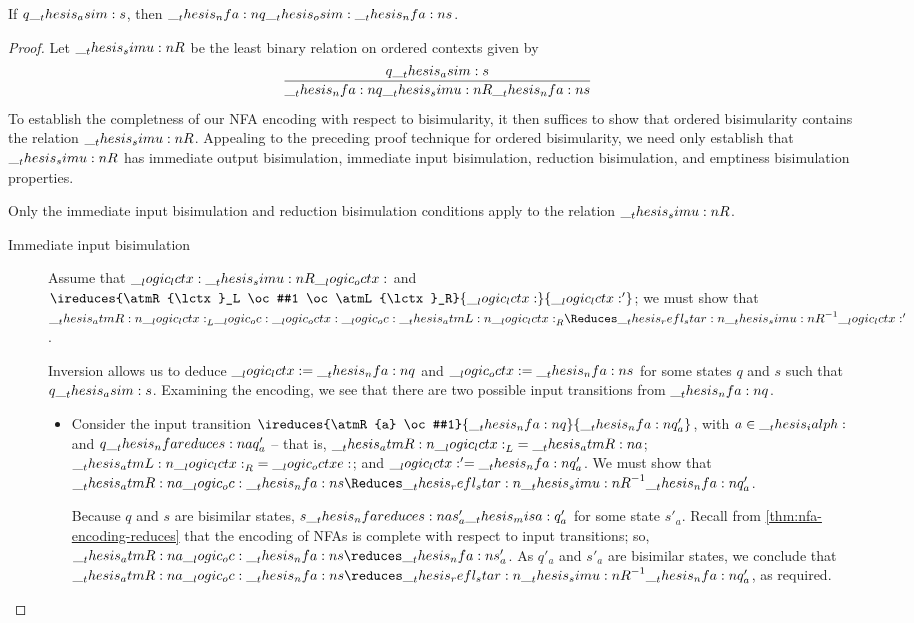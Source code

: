\begin{theorem}
  If $q \__thesis_asim: s$, then $\__thesis_nfa:n {q} \__thesis_osim: \__thesis_nfa:n {s}$.
\end{theorem}
%
\begin{proof}
  Let $\__thesis_simu:n {R}$ be the least binary relation%
  on ordered contexts given by
  \begin{equation*}
    \infer{\nfa{q} \simu{R} \nfa{s}}{
      q \asim s}
  \end{equation*}
  To establish the completness of our \ac{NFA} encoding with respect to bisimularity, it then suffices to show that ordered bisimularity contains the relation $\__thesis_simu:n {R}$.
  Appealing to the preceding proof technique for ordered bisimularity, we need only establish that $\__thesis_simu:n {R}$ has immediate output bisimulation, immediate input bisimulation, reduction bisimulation, and emptiness bisimulation properties.

  Only the immediate input bisimulation and reduction bisimulation conditions apply to the relation $\__thesis_simu:n {R}$.
  \begin{description}
  \item[Immediate input bisimulation]
    Assume that $\__logic_lctx: \__thesis_simu:n {R} \__logic_octx:$ and $\ireduces{\atmR{\lctx}_L \oc #1 \oc \atmL{\lctx}_R}{\lctx}{\lctx'}$;
    we must show that $\atmR{\lctx}_L \oc \octx \oc \atmL{\lctx}_R \Reduces\refl*{\simu{R}}^{-1} \lctx'$.

    Inversion allows us to deduce $\__logic_lctx: = \__thesis_nfa:n {q}$ and $\__logic_octx: = \__thesis_nfa:n {s}$ for some states $q$ and $s$ such that $q \__thesis_asim: s$.
    Examining the encoding, we see that there are two possible input transitions from $\__thesis_nfa:n {q}$.
    \begin{itemize}
    \item Consider the input transition $\ireduces{\atmR{a} \oc #1}{\nfa{q}}{\nfa{q}'_a}$, with $a \in \__thesis_ialph:$ and $q \nfareduces[a] q'_a$ -- that is, $\__thesis_atmR:n {\__logic_lctx:}_L = \__thesis_atmR:n {a}$; $\__thesis_atmL:n {\__logic_lctx:}_R = \__logic_octxe:$; and $\__logic_lctx:' = \__thesis_nfa:n {q}'_a$.
      We must show that $\atmR{a} \oc \nfa{s} \Reduces\refl*{\simu{R}}^{-1} \nfa{q}'_a$.

      Because $q$ and $s$ are bisimilar states, $s \nfareduces[a] s'_a \misa q'_a$ for some state $s'_a$.
      Recall from \cref{thm:nfa-encoding-reduces} that the encoding of \acp{NFA} is complete with respect to input transitions; so, $\atmR{a} \oc \nfa{s} \reduces \nfa{s}'_a$.
      As $q'_a$ and $s'_a$ are bisimilar states, we conclude that $\atmR{a} \oc \nfa{s} \reduces\refl*{\simu{R}}^{-1} \nfa{q}'_a$, as required.


\end{itemize}
\end{description}
\end{proof}
